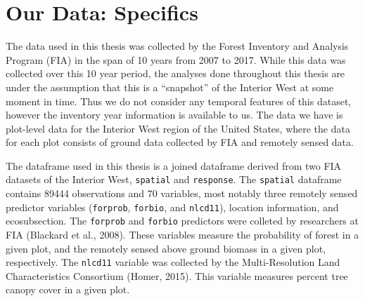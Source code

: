 \documentclass[12pt,twoside]{reedthesis}
\begin{document}
\hypertarget{our-data-specifics}{%
\section{Our Data: Specifics}\label{our-data-specifics}}

The data used in this thesis was collected by the Forest Inventory and Analysis Program (FIA) in the span of 10 years from 2007 to 2017. While this data was collected over this 10 year period, the analyses done throughout this thesis are under the assumption that this is a ``snapshot'' of the Interior West at some moment in time. Thus we do not consider any temporal features of this dataset, however the inventory year information is available to us. The data we have is plot-level data for the Interior West region of the United States, where the data for each plot consists of ground data collected by FIA and remotely sensed data.

The dataframe used in this thesis is a joined dataframe derived from two FIA datasets of the Interior West, \texttt{spatial} and \texttt{response}. The \texttt{spatial} dataframe contains 89444 observations and 70 variables, most notably three remotely sensed predictor variables (\texttt{forprob}, \texttt{forbio}, and \texttt{nlcd11}), location information, and ecosubsection. The \texttt{forprob} and \texttt{forbio} predictors were colleted by researchers at FIA (Blackard et al., 2008). These variables measure the probability of forest in a given plot, and the remotely sensed above ground biomass in a given plot, respectively. The \texttt{nlcd11} variable was collected by the Multi-Resolution Land Characteristics Consortium (Homer, 2015). This variable measures percent tree canopy cover in a given plot.
\end{document}
